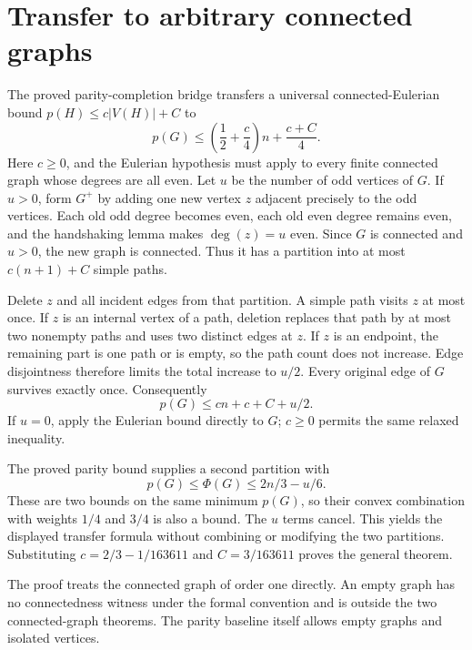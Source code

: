 \documentclass[11pt]{article}
\begin{document}
\section{Transfer to arbitrary connected graphs}
The proved parity-completion bridge transfers a universal connected-Eulerian bound $p(H)\leq c|V(H)|+C$ to
\[
 p(G)\leq\left(\frac12+\frac c4\right)n+\frac{c+C}{4}.
\]
Here $c\geq0$, and the Eulerian hypothesis must apply to every finite connected graph whose degrees are all even. Let $u$ be the number of odd vertices of $G$. If $u>0$, form $G^+$ by adding one new vertex $z$ adjacent precisely to the odd vertices. Each old odd degree becomes even, each old even degree remains even, and the handshaking lemma makes $\deg(z)=u$ even. Since $G$ is connected and $u>0$, the new graph is connected. Thus it has a partition into at most $c(n+1)+C$ simple paths.

Delete $z$ and all incident edges from that partition. A simple path visits $z$ at most once. If $z$ is an internal vertex of a path, deletion replaces that path by at most two nonempty paths and uses two distinct edges at $z$. If $z$ is an endpoint, the remaining part is one path or is empty, so the path count does not increase. Edge disjointness therefore limits the total increase to $u/2$. Every original edge of $G$ survives exactly once. Consequently
\[
 p(G)\leq cn+c+C+u/2.
\]
If $u=0$, apply the Eulerian bound directly to $G$; $c\geq0$ permits the same relaxed inequality.

The proved parity bound supplies a second partition with
\[
 p(G)\leq\Phi(G)\leq 2n/3-u/6.
\]
These are two bounds on the same minimum $p(G)$, so their convex combination with weights $1/4$ and $3/4$ is also a bound. The $u$ terms cancel. This yields the displayed transfer formula without combining or modifying the two partitions. Substituting $c=2/3-1/163611$ and $C=3/163611$ proves the general theorem.

The proof treats the connected graph of order one directly. An empty graph has no connectedness witness under the formal convention and is outside the two connected-graph theorems. The parity baseline itself allows empty graphs and isolated vertices.
\end{document}
